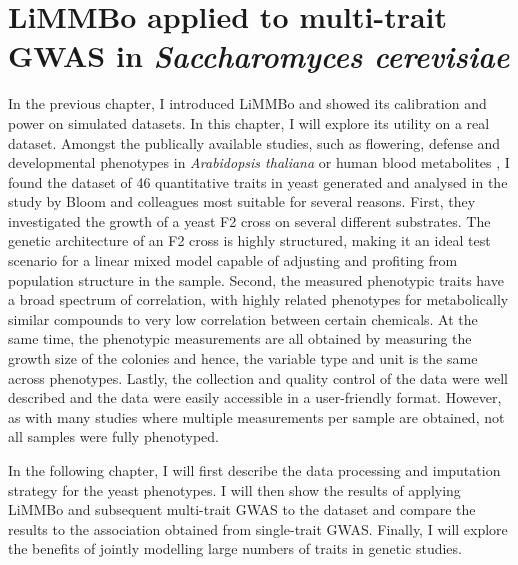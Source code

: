 \chapter{LiMMBo applied to multi-trait GWAS  in \emph{Saccharomyces cerevisiae}}
\label{chapter:yeast}
In the previous chapter, I introduced LiMMBo and showed its calibration and power on simulated datasets. In this chapter, I will explore its utility on a real dataset. Amongst the publically available studies, such as flowering, defense and developmental phenotypes in \textit{Arabidopsis thaliana} \citep{Atwell2010} or human blood metabolites \citep{Shin2014}, I found the dataset of 46 quantitative traits in yeast generated and analysed in the study by Bloom and colleagues \citep{Bloom2013} most suitable for several reasons. First, they investigated the growth of a yeast F2 cross on several different substrates.  The genetic architecture of an F2 cross is highly structured, making it an ideal test scenario for a linear mixed model capable of adjusting and profiting from population structure in the sample. Second, the measured phenotypic traits have a broad spectrum of correlation, with highly related phenotypes for metabolically similar compounds to very low correlation between certain chemicals. At the same time, the phenotypic measurements are all obtained by measuring the growth size of the colonies and hence, the variable type and unit is the same across phenotypes. Lastly, the collection and quality control of the data were well described and the data were easily accessible in a user-friendly format. However, as with many studies where multiple measurements per sample are obtained, not all samples were fully phenotyped. 

In the following chapter, I will first describe the data processing and imputation strategy for the yeast phenotypes. I will then show the results of applying LiMMBo and subsequent multi-trait GWAS to the dataset and compare the results to the association obtained from single-trait GWAS. Finally, I will explore the benefits of jointly modelling large numbers of traits in genetic studies.

